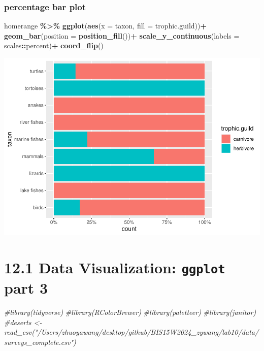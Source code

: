 \documentclass[
]{article}
\newenvironment{Shaded}{\begin{snugshade}}{\end{snugshade}}
\newcommand{\AttributeTok}[1]{\textcolor[rgb]{0.13,0.29,0.53}{#1}}
\newcommand{\CommentTok}[1]{\textcolor[rgb]{0.56,0.35,0.01}{\textit{#1}}}
\newcommand{\FunctionTok}[1]{\textcolor[rgb]{0.13,0.29,0.53}{\textbf{#1}}}
\newcommand{\NormalTok}[1]{#1}
\newcommand{\SpecialCharTok}[1]{\textcolor[rgb]{0.81,0.36,0.00}{\textbf{#1}}}
\begin{document}
\hypertarget{percentage-bar-plot}{%
\subsubsection{percentage bar plot}\label{percentage-bar-plot}}

\begin{Shaded}
\begin{Highlighting}[]
\NormalTok{homerange }\SpecialCharTok{\%\textgreater{}\%} 
  \FunctionTok{ggplot}\NormalTok{(}\FunctionTok{aes}\NormalTok{(}\AttributeTok{x =}\NormalTok{ taxon, }\AttributeTok{fill =}\NormalTok{ trophic.guild))}\SpecialCharTok{+}
  \FunctionTok{geom\_bar}\NormalTok{(}\AttributeTok{position =} \FunctionTok{position\_fill}\NormalTok{())}\SpecialCharTok{+} 
  \FunctionTok{scale\_y\_continuous}\NormalTok{(}\AttributeTok{labels =}\NormalTok{ scales}\SpecialCharTok{::}\NormalTok{percent)}\SpecialCharTok{+}
  \FunctionTok{coord\_flip}\NormalTok{()}
\end{Highlighting}
\end{Shaded}

\includegraphics{Untitled_files/figure-latex/unnamed-chunk-32-1.pdf}

\hypertarget{data-visualization-ggplot-part-3}{%
\section{\texorpdfstring{12.1 Data Visualization: \texttt{ggplot} part
3}{12.1 Data Visualization: ggplot part 3}}\label{data-visualization-ggplot-part-3}}

\begin{Shaded}
\begin{Highlighting}[]
\CommentTok{\#library(tidyverse)}
\CommentTok{\#library(RColorBrewer)}
\CommentTok{\#library(paletteer)}
\CommentTok{\#library(janitor)}
\CommentTok{\#deserts \textless{}{-} read\_csv("/Users/zhuoyawang/desktop/github/BIS15W2024\_zywang/lab10/data/surveys\_complete.csv")}
\end{Highlighting}
\end{Shaded}
\end{document}
